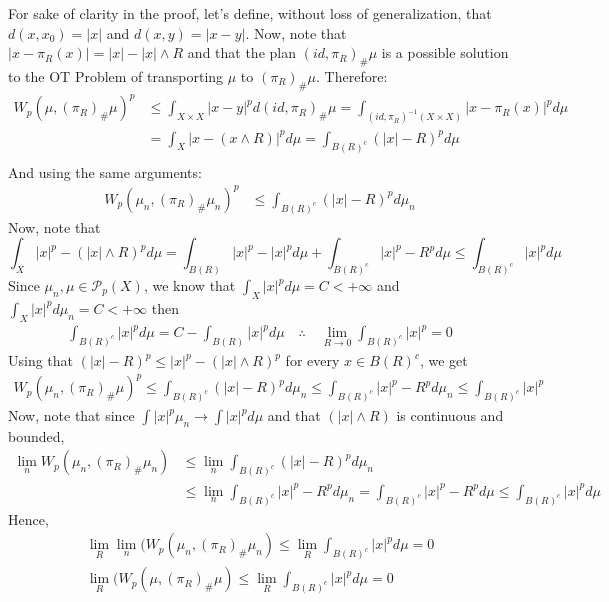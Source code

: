 \begin{prf}
For sake of clarity in the proof, let's define, without loss of generalization, that $d(x,x_0) = |x|$ and
$d(x,y) = |x-y|$.
Now, note that $|x - \pi_R(x)| =|x| - |x| \wedge R$ and
that the plan $(id,\pi_R)_\# \mu$ is a possible solution to the OT Problem of transporting
$\mu$ to $(\pi_R)_\#\mu$. Therefore:
\begin{align*}
  W_p(\mu,(\pi_R)_\# \mu)^p & \leq
  \int_{X \times X} |x-y|^p d (id,\pi_R)_\# \mu =
  \int_{(id,\pi_R)^{-1}(X\times X)} |x-\pi_R(x)|^p d\mu \\
                            & =
  \int_{X} |x-(x\wedge R)|^p d\mu =
  \int_{B(R)^c} (|x|-R)^p d\mu                                    \\
\end{align*}
And using the same arguments:
\begin{align*}
  W_p(\mu_n,(\pi_R)_\# \mu_n)^p & \leq
  \int_{B(R)^c} (|x|-R)^p d\mu_n
\end{align*}
Now, note that
\begin{equation*}
  \int_X |x|^p - (|x|\wedge R)^p d\mu = \int_{B(R)}|x|^p -|x|^p d\mu
  + \int_{B(R)^c} |x|^p - R^p d\mu \leq \int_{B(R)^c} |x|^p d\mu
\end{equation*}
Since $\mu_n, \mu \in \mathcal P_p(X)$, we know that
$\int_{X}|x|^p d\mu = C < +\infty$ and
$\int_{X}|x|^p d\mu_n = C < +\infty$ then
\begin{align*}
  \int_{B(R)^c} |x|^p d\mu = C - \int_{B(R)}|x|^p d\mu \quad \therefore \quad
  \lim_{R \to 0}
  \int_{B(R)^c}|x|^p = 0
\end{align*}
Using that $(|x|- R)^p \leq |x|^p - (|x|\wedge R)^p$ for every $x \in B(R)^c$, we get
\begin{align*}
  W_p(\mu_n,(\pi_R)_\# \mu)^p \leq
  \int_{B(R)^c} (|x|-R)^p d\mu_n \leq
  \int_{B(R)^c} |x|^p-R^p d\mu_n \leq
  \int_{B(R)^c}|x|^p
\end{align*}
Now, note that since $\int|x|^p \mu_n \to \int|x|^p d\mu$ and that $(|x|\wedge R)$ is continuous and bounded,
\begin{align*}
  \lim_n
  W_p(\mu_n,(\pi_R)_\#\mu_n) & \leq
  \lim_n
  \int_{B(R)^c} (|x|-R)^p d\mu_n    \\
                             & \leq
  \lim_n
  \int_{B(R)^c} |x|^p-R^p d\mu_n =
  \int_{B(R)^c} |x|^p-R^p d\mu \leq
  \int_{B(R)^c} |x|^p d\mu
\end{align*}
Hence,
\begin{align*}
  \lim_R \lim_n (W_p(\mu_n,(\pi_R)_\#\mu_n) \leq \lim_R
  \int_{B(R)^c} |x|^p d\mu = 0 \\
  \lim_R (W_p(\mu,(\pi_R)_\#\mu) \leq \lim_R
  \int_{B(R)^c} |x|^p d\mu = 0
\end{align*}


\end{prf}
